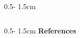\documentclass{uibposter}
\begin{document}
\begin{frame}[fragile]
\begin{columns}
\begin{column}{0.5\textwidth - 1.5cm}
\begin{column}{0.5\textwidth - 1.5cm}
    \vspace{0.5cm}
    \textbf{\scriptsize{References}}
    \vspace{0.3cm}
    \nocite{*} 
    
    
    

\end{column}
\end{column}
\end{columns}





\end{frame}
\end{document}
